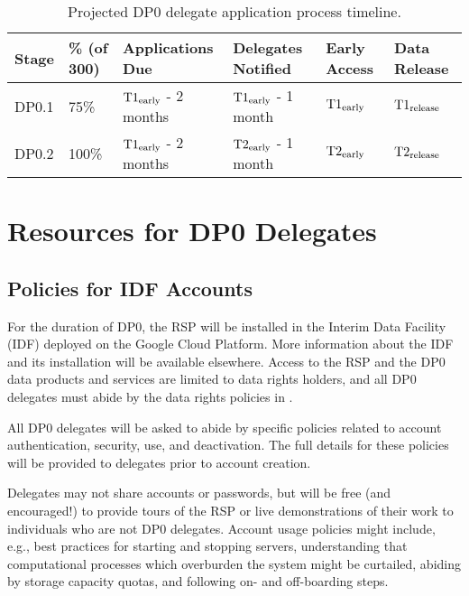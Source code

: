 \documentclass[DM,lsstdraft,authoryear,toc]{lsstdoc}
\begin{document}
\begin{table}[!h]
\centering
\caption{Projected DP0 delegate application process timeline.}\label{tab:selection_timeline}
\begin{tabular}{llllll}
\hline
Stage & \% (of 300) & Applications Due & Delegates Notified & Early Access & Data Release \\
\hline \hline
DP0.1 & 75\%   & $\rm{T1_{early}}$ - 2 months & $\rm{T1_{early}}$ - 1 month & $\rm{T1_{early}}$ & $\rm{T1_{release}}$ \\
DP0.2 & 100\% & $\rm{T1_{early}}$ - 2 months & $\rm{T2_{early}}$ - 1 month & $\rm{T2_{early}}$ & $\rm{T2_{release}}$ \\
\hline
\end{tabular}
\end{table}


\section{Resources for DP0 Delegates}\label{sec:res}

\subsection{Policies for IDF Accounts}\label{ssec:res_pol}

For the duration of DP0, the RSP will be installed in the Interim Data Facility (IDF) deployed on the Google Cloud Platform.
More information about the IDF and its installation will be available elsewhere.
Access to the RSP and the DP0 data products and services are limited to data rights holders, and all DP0 delegates must abide by the data rights policies in .

All DP0 delegates will be asked to abide by specific policies related to account authentication, security, use, and deactivation.
The full details for these policies will be provided to delegates prior to account creation. 

Delegates may not share accounts or passwords, but will be free (and encouraged!) to provide tours of the RSP or live demonstrations of their work to individuals who are not DP0 delegates.
Account usage policies might include, e.g., best practices for starting and stopping servers, understanding that computational processes which overburden the system might be curtailed, abiding by storage capacity quotas, and following on- and off-boarding steps.
\end{document}
